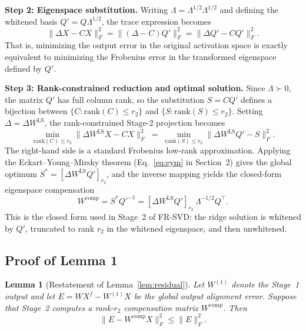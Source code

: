 \documentclass[a4paper,fleqn]{cas-dc}
\newtheorem*{lemma*}{Lemma}
\begin{document}
\medskip
\noindent\textbf{Step 2: Eigenspace substitution.}
Writing $\Lambda = \Lambda^{1/2}\Lambda^{1/2}$ and defining the whitened basis $Q' = Q\Lambda^{1/2}$, the trace expression becomes
\begin{equation}
\|\Delta X - CX\|_F^2 = \|(\Delta-C)Q'\|_F^2 = \|\Delta Q' - CQ'\|_F^2.
\end{equation}
That is, minimizing the output error in the original activation space is exactly equivalent to minimizing the Frobenius error in the transformed eigenspace defined by $Q'$.

\medskip
\noindent\textbf{Step 3: Rank-constrained reduction and optimal solution.}
Since $\Lambda \succ 0$, the matrix $Q'$ has full column rank, so the substitution $S=CQ'$ defines a bijection between $\{C : \mathrm{rank}(C)\le r_2\}$ and $\{S : \mathrm{rank}(S)\le r_2\}$. Setting $\Delta = \Delta W^{\mathrm{LS}}$, the rank-constrained Stage-2 projection becomes
\begin{equation}
\min_{\mathrm{rank}(C)\le r_2} \|\Delta W^{\mathrm{LS}} X - CX\|_F^2
\;=\;
\min_{\mathrm{rank}(S)\le r_2} \|\Delta W^{\mathrm{LS}} Q' - S\|_F^2.
\end{equation}
The right-hand side is a standard Frobenius low-rank approximation. Applying the Eckart--Young--Mirsky theorem (Eq.~\eqref{eq:eym} in Section~2) gives the global optimum $S^* = [\Delta W^{\mathrm{LS}} Q']_{r_2}$, and the inverse mapping yields the closed-form eigenspace compensation
\begin{equation}
W^{\mathrm{comp}} = S^* Q'^{-1} = [\Delta W^{\mathrm{LS}} Q']_{r_2}\,\Lambda^{-1/2} Q^{\top}.
\label{eq:eigenspace-comp}
\end{equation}
This is the closed form used in Stage~2 of FR-SVD: the ridge solution is whitened by $Q'$, truncated to rank $r_2$ in the whitened eigenspace, and then unwhitened.

\subsection{Proof of Lemma 1}\label{app:proof-lemma1}

\begin{lemma*}[Restatement of Lemma~\ref{lem:residual}]
Let $W^{(1)}$ denote the Stage~1 output and let $E = WX^f - W^{(1)}X$ be the global output alignment error. Suppose that Stage~2 computes a rank-$r_2$ compensation matrix $W^{\mathrm{comp}}$. Then
\begin{equation}
\|E - W^{\mathrm{comp}}X\|_F^2 \le \|E\|_F^2.
\end{equation}
\end{lemma*}
\end{document}
